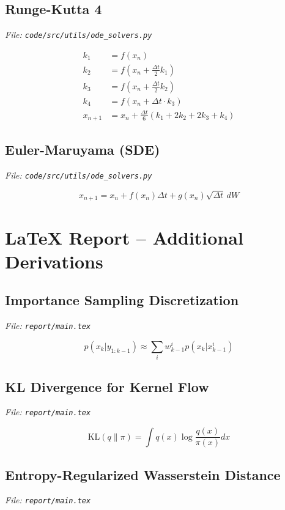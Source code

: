 \documentclass[12pt]{article}
\begin{document}
\subsection{Runge-Kutta 4}
\textit{File: \texttt{code/src/utils/ode\_solvers.py}}

\begin{align}
k_1 &= f(x_n) \\
k_2 &= f(x_n + \frac{\Delta t}{2} k_1) \\
k_3 &= f(x_n + \frac{\Delta t}{2} k_2) \\
k_4 &= f(x_n + \Delta t \cdot k_3) \\
x_{n+1} &= x_n + \frac{\Delta t}{6}(k_1 + 2k_2 + 2k_3 + k_4)
\end{align}

\subsection{Euler-Maruyama (SDE)}
\textit{File: \texttt{code/src/utils/ode\_solvers.py}}

\begin{equation}
x_{n+1} = x_n + f(x_n) \Delta t + g(x_n) \sqrt{\Delta t} \, dW
\end{equation}

\section{LaTeX Report -- Additional Derivations}

\subsection{Importance Sampling Discretization}
\textit{File: \texttt{report/main.tex}}

\begin{equation}
p(x_k | y_{1:k-1}) \approx \sum_i w_{k-1}^i p(x_k | x_{k-1}^i)
\end{equation}

\subsection{KL Divergence for Kernel Flow}
\textit{File: \texttt{report/main.tex}}

\begin{equation}
\text{KL}(q \| \pi) = \int q(x) \log\frac{q(x)}{\pi(x)} dx
\end{equation}

\subsection{Entropy-Regularized Wasserstein Distance}
\textit{File: \texttt{report/main.tex}}
\end{document}
